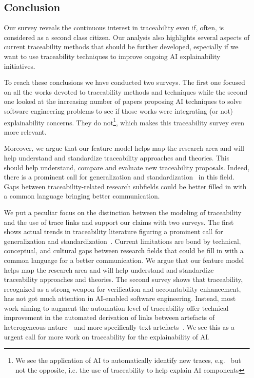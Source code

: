 \subsection{Conclusion}\label{sec:conclusion}

Our survey reveals the continuous interest in traceability even if, often, is considered as a second class citizen. Our analysis also highlights several aspects of current traceability methods that should be further developed, especially if we want to use traceability techniques to improve ongoing AI explainability initiatives. 

To reach these conclusions we have conducted two surveys. The first one focused on all the works devoted to traceability methods and techniques while the second one looked at the increasing number of papers proposing AI techniques to solve software engineering problems to see if those works were integrating (or not) explainability concerns. They do not\footnote{We see the application of AI to automatically identify new traces, e.g.~\cite{clelandhuang2014-traceability-trends-and-futurte-direction} but not the opposite, i.e. the use of traceability to help explain AI components}, which makes this traceability survey even more relevant. 

Moreover, we argue that our feature model helps map the research area and will help understand and standardize traceability approaches and theories. This should help understand, compare and evaluate new traceability proposals. Indeed, there is a prominent call for generalization and standardization~\cite{wohlrab2020-traceability-organization-process-culture} in this field. Gaps between traceability-related research subfields could be better filled in with a common language bringing better communication.

We put a peculiar focus on the distinction between the modeling of traceability and the use of trace links and support our claims with two surveys. The first shows actual trends in traceability literature figuring a prominent call for generalization and standardization~\cite{wohlrab2020-traceability-organization-process-culture}. Current limitations are bond by technical, conceptual, and cultural gaps between research fields that could be fill in with a common language for a better communication. We argue that our feature model helps map the research area and will help understand and standardize traceability approaches and theories. The second survey shows that traceability, recognized as a strong weapon for verification and accountability enhancement, has not got much attention in AI-enabled software engineering. Instead, most work aiming to augment the automation level of traceability offer technical improvement in the automated derivation of links between artefacts of heterogeneous nature - and more specifically text artefacts~\cite{clelandhuang2014-traceability-trends-and-futurte-direction}.
We see this as a urgent call for more work on traceability for the explainability of AI.


